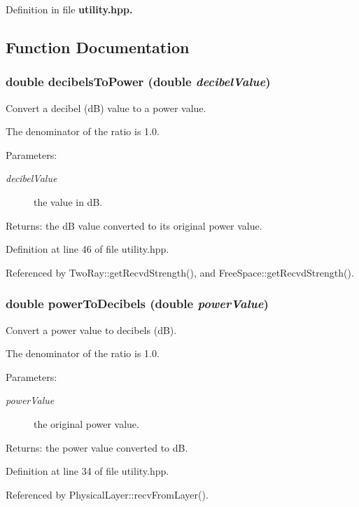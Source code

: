 Definition in file \bf{utility.hpp}.

\subsection{Function Documentation}
\subsubsection{\setlength{\rightskip}{0pt plus 5cm}double decibels\-To\-Power (double {\em decibel\-Value})\hspace{0.3cm}{\tt  [inline]}}\label{utility_8hpp_63d6a479f3a8afb8c62e4dd404918523}


Convert a decibel (d\-B) value to a power value. 

The denominator of the ratio is 1.0. \begin{Desc}
\item[Parameters:]
\begin{description}
\item[{\em decibel\-Value}]the value in d\-B. \end{description}
\end{Desc}
\begin{Desc}
\item[Returns:]the d\-B value converted to its original power value. \end{Desc}


Definition at line 46 of file utility.hpp.

Referenced by Two\-Ray::get\-Recvd\-Strength(), and Free\-Space::get\-Recvd\-Strength().
\subsubsection{\setlength{\rightskip}{0pt plus 5cm}double power\-To\-Decibels (double {\em power\-Value})\hspace{0.3cm}{\tt  [inline]}}\label{utility_8hpp_5a6d9dd7000e7af2d1b9d4d3204f8fd3}


Convert a power value to decibels (d\-B). 

The denominator of the ratio is 1.0. \begin{Desc}
\item[Parameters:]
\begin{description}
\item[{\em power\-Value}]the original power value. \end{description}
\end{Desc}
\begin{Desc}
\item[Returns:]the power value converted to d\-B. \end{Desc}


Definition at line 34 of file utility.hpp.

Referenced by Physical\-Layer::recv\-From\-Layer().